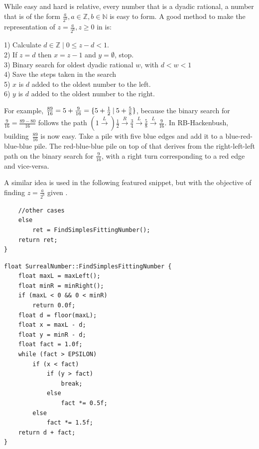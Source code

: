 While easy and hard is relative, every number that is a dyadic rational, a number that is of the form $\frac{a}{2^b}, a\in\mathbb{Z}, b \in \mathbb{N}$ is easy to form. A good method to make the representation of $z = \frac{a}{2^b}, z \ge 0$ in  is:\\
\begin{adjustwidth}{2cm}{}
	1) Calculate $d\in \mathbb{Z}\;|\;0 \leq z-d < 1$.\\
	2) If $z=d$ then $x = z-1$ and $y=\emptyset$, stop.\\ 
	3) Binary search for oldest dyadic rational $w$, with $d < w < 1$\\
	4) Save the steps taken in the search \\
	5) $x$ is $d$ added to the oldest number to the left.\\
	6) $y$ is $d$ added to the oldest number to the right.
\end{adjustwidth} \vspace{0.5cm}

For example, $\frac{89}{16} = 5 + \frac{9}{16} = \mbox{$\{5 + \frac{1}{2}\:|\:5+\frac{5}{8}\}$}$, because the binary search for \mbox{$\frac{9}{16} = \frac{89-80}{16}$} follows the path $(1\xrightarrow[]{L})\frac{1}{2}\xrightarrow[]{R} \frac{3}{4}\xrightarrow[]{L}\frac{5}{8}\xrightarrow[]{L}\frac{9}{16}$. In RB-Hackenbush, building~$\frac{89}{16}$ is now easy. Take a pile with five blue edges and add it to a blue-red-blue-blue pile. The red-blue-blue pile on top of that derives from the right-left-left path on the binary search for $\frac{9}{16}$, with a right turn corresponding to a red edge and vice-versa.

A similar idea is used in the following featured snippet, but with the objective of finding $z = \frac{a}{2^b}$ given .

\begin{verbatim}
	//other cases
	else
		ret = FindSimplesFittingNumber();
	return ret;
}
\end{verbatim}
\newpage
\begin{verbatim}
float SurrealNumber::FindSimplesFittingNumber {
	float maxL = maxLeft();
	float minR = minRight();
	if (maxL < 0 && 0 < minR)
		return 0.0f;
	float d = floor(maxL);
	float x = maxL - d;
	float y = minR - d;
	float fact = 1.0f;
	while (fact > EPSILON)
		if (x < fact)
			if (y > fact)
				break;
			else
				fact *= 0.5f;
		else
			fact *= 1.5f;
	return d + fact;
}
\end{verbatim}

